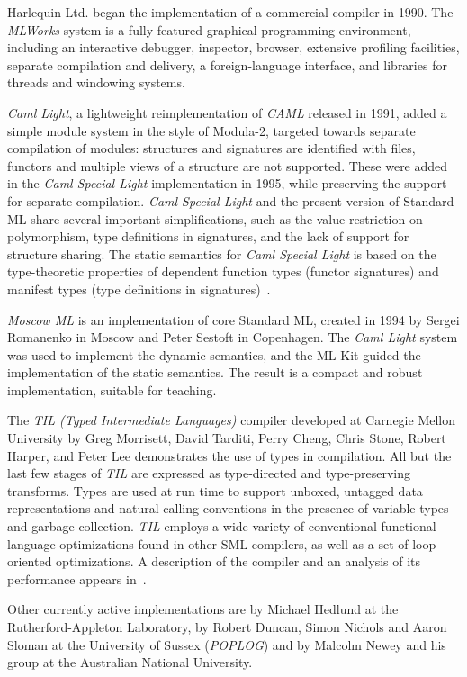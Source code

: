 Harlequin Ltd. began the implementation of a commercial compiler in 1990.  The
{\em MLWorks} system is a fully-featured graphical programming environment,
including an interactive debugger, inspector, browser, extensive profiling
facilities, separate compilation and delivery, a foreign-language interface,
and libraries for threads and windowing systems.

{\em Caml Light}, a lightweight reimplementation of {\em CAML} released in
1991, added a simple module system in the style of Modula-2, targeted towards
separate compilation of modules: structures and signatures are identified with
files, functors and multiple views of a structure are not supported.  These
were added in the {\em Caml Special Light} implementation in 1995, while
preserving the support for separate compilation. {\em Caml Special Light} and
the present version of Standard ML share several important simplifications,
such as the value restriction on polymorphism, type definitions in signatures,
and the lack of support for structure sharing.  The static semantics for {\em
Caml Special Light} is based on the type-theoretic properties of dependent
function types (functor signatures) and manifest types (type definitions in
signatures)~\cite{leroy94}.

{\em Moscow ML} is an implementation of core Standard ML, created in 1994 by
Sergei Romanenko in Moscow and Peter Sestoft in Copenhagen.  The {\em Caml
Light} system was used to implement the dynamic semantics, and the ML Kit
guided the implementation of the static semantics.  The result is a compact
and robust implementation, suitable for teaching.

The {\em TIL (Typed Intermediate Languages)} compiler developed at Carnegie
Mellon
University by Greg Morrisett, David Tarditi, Perry Cheng, Chris Stone,
Robert Harper,
and Peter Lee demonstrates the use of
types in compilation.  All but the last few stages of {\em TIL} are expressed
as type-directed and type-preserving transforms.  Types are used at run time
to support unboxed, untagged data representations and natural calling
conventions in the presence of variable types and garbage collection.  {\em
TIL} employs a wide variety of conventional functional language optimizations
found in other SML compilers, as well as a set of loop-oriented optimizations.
A description of the compiler and an analysis of its performance appears
in~\cite{Tar}.

Other currently active implementations are by Michael Hedlund at the
Rutherford-Appleton Laboratory, by Robert Duncan, Simon Nichols and Aaron
Sloman at the University of Sussex ({\em POPLOG}) and by Malcolm Newey and his
group at the Australian National University.

